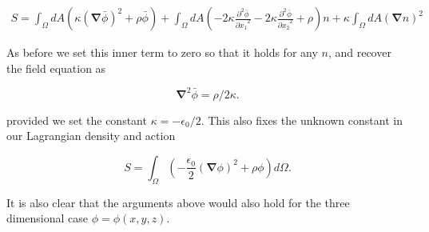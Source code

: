 \documentclass{article}
\newcommand{\spacegrad}[0]{\boldsymbol{\nabla}}
\newcommand{\PDd}[2]{\frac{\partial^2 {#2}}{{\partial{#1}}^2}}
\begin{document}
\begin{align*}
S = \int_{\Omega} dA \left( \kappa {(\spacegrad \bar{\phi})}^2 + \rho \bar{\phi} \right)
  + \int_{\Omega} dA \left( -2 \kappa \PDd{x_1}{\bar{\phi}} -2 \kappa \PDd{x_2}{\bar{\phi}} + \rho \right) n
  + \kappa \int_{\Omega} dA {(\spacegrad n)}^2 
\end{align*}

As before we set this inner term to zero so that it holds for any $n$, and recover the field equation as

\begin{equation*}
\spacegrad^2 \bar{\phi} = \rho/2 \kappa.
\end{equation*}

provided we set the constant $\kappa = -\epsilon_0/2$.  This also fixes the unknown constant in our Lagrangian density and action

\begin{equation}
S = \int_{\Omega} \left(- \frac{\epsilon_0}{2} (\spacegrad \phi)^2 + \rho \phi \right) d\Omega.
\end{equation}

It is also clear that the arguments above would also hold for the three dimensional case $\phi = \phi(x, y, z)$.
\end{document}
